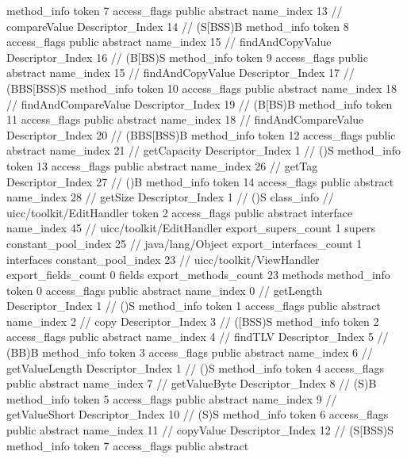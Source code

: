 {{{{{				}
				method_info {
					token	7
					access_flags	public abstract
					name_index	13		// compareValue
					Descriptor_Index	14		// (S[BSS)B
				}
				method_info {
					token	8
					access_flags	public abstract
					name_index	15		// findAndCopyValue
					Descriptor_Index	16		// (B[BS)S
				}
				method_info {
					token	9
					access_flags	public abstract
					name_index	15		// findAndCopyValue
					Descriptor_Index	17		// (BBS[BSS)S
				}
				method_info {
					token	10
					access_flags	public abstract
					name_index	18		// findAndCompareValue
					Descriptor_Index	19		// (B[BS)B
				}
				method_info {
					token	11
					access_flags	public abstract
					name_index	18		// findAndCompareValue
					Descriptor_Index	20		// (BBS[BSS)B
				}
				method_info {
					token	12
					access_flags	public abstract
					name_index	21		// getCapacity
					Descriptor_Index	1		// ()S
				}
				method_info {
					token	13
					access_flags	public abstract
					name_index	26		// getTag
					Descriptor_Index	27		// ()B
				}
				method_info {
					token	14
					access_flags	public abstract
					name_index	28		// getSize
					Descriptor_Index	1		// ()S
				}
			}
		}
		class_info {		// uicc/toolkit/EditHandler
			token	2
			access_flags	public abstract interface
			name_index	45		// uicc/toolkit/EditHandler
			export_supers_count	1
			supers {
				constant_pool_index	25		// java/lang/Object
			}
			export_interfaces_count	1
			interfaces {
				constant_pool_index	23		// uicc/toolkit/ViewHandler
			}
			export_fields_count	0
			fields {
			}
			export_methods_count	23
			methods {
				method_info {
					token	0
					access_flags	public abstract
					name_index	0		// getLength
					Descriptor_Index	1		// ()S
				}
				method_info {
					token	1
					access_flags	public abstract
					name_index	2		// copy
					Descriptor_Index	3		// ([BSS)S
				}
				method_info {
					token	2
					access_flags	public abstract
					name_index	4		// findTLV
					Descriptor_Index	5		// (BB)B
				}
				method_info {
					token	3
					access_flags	public abstract
					name_index	6		// getValueLength
					Descriptor_Index	1		// ()S
				}
				method_info {
					token	4
					access_flags	public abstract
					name_index	7		// getValueByte
					Descriptor_Index	8		// (S)B
				}
				method_info {
					token	5
					access_flags	public abstract
					name_index	9		// getValueShort
					Descriptor_Index	10		// (S)S
				}
				method_info {
					token	6
					access_flags	public abstract
					name_index	11		// copyValue
					Descriptor_Index	12		// (S[BSS)S
				}
				method_info {
					token	7
					access_flags	public abstract
}}}}}
